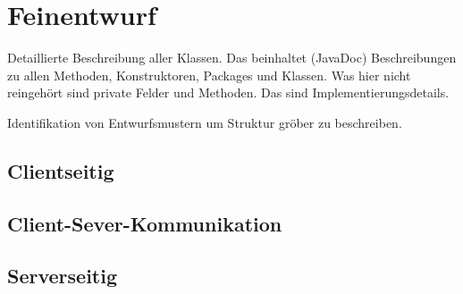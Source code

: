 \section{Feinentwurf}
Detaillierte Beschreibung aller Klassen. Das beinhaltet (JavaDoc) Beschreibungen zu allen Methoden, Konstruktoren, Packages und Klassen. Was hier nicht reingehört sind private Felder und Methoden. Das sind Implementierungsdetails.

Identifikation von Entwurfsmustern um Struktur gröber zu beschreiben.

\subsection{Clientseitig}

\subsection{Client-Sever-Kommunikation}

\subsection{Serverseitig}

